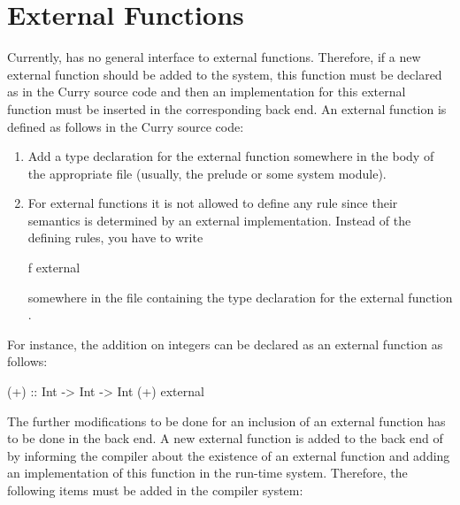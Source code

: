 \section{External Functions}
\label{sec-external-functions}

Currently, \CYS has no general interface to external functions.
Therefore, if a new external function should be added
to the system, this function must be declared as 
in the Curry source code
and then an implementation for this external function
must be inserted in the corresponding back end.
An external function is defined as follows in the Curry source code:
\begin{enumerate}
\item
Add a type declaration for the external function somewhere
in the body of the appropriate file (usually, the prelude
or some system module).
\item
For external functions it is not allowed to define any
rule since their semantics is determined by an external implementation.
Instead of the defining rules, you have to write
\begin{curry}
f external
\end{curry}
somewhere in the file containing the type declaration for 
the external function .
\end{enumerate}
For instance, the addition on integers can be declared as
an external function as follows:
\begin{curry}
(+) :: Int -> Int -> Int
(+) external
\end{curry}
The further modifications to be done for an inclusion of
an external function has to be done in the back end.
A new external function is added to the back end of \CYS
by informing the compiler about the existence of an external function
and adding an implementation of this function in the run-time
system. Therefore, the following items must be added
in the \CYS compiler system:
